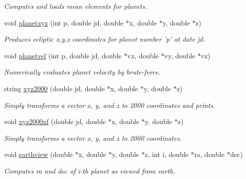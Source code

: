 \begin{DoxyCompactItemize}
\begin{DoxyCompactList}\small\item\em Computes and loads mean elements for planets. \end{DoxyCompactList}\item 
void \hyperlink{class_planets_affe556f802a6f7788a4956f79a17c38e}{planetxyz} (int p, double jd, double $\ast$x, double $\ast$y, double $\ast$z)
\begin{DoxyCompactList}\small\item\em Produces ecliptic x,y,z coordinates for planet number 'p' at date jd. \end{DoxyCompactList}\item 
void \hyperlink{class_planets_acef63742b8b2a08ae1c661fb0dcc25ce}{planetvel} (int p, double jd, double $\ast$vx, double $\ast$vy, double $\ast$vz)
\begin{DoxyCompactList}\small\item\em Numerically evaluates planet velocity by brute-\/force. \end{DoxyCompactList}\item 
string \hyperlink{class_planets_a72d643faf2889a444075e30f1b15e1d0}{xyz2000} (double jd, double $\ast$x, double $\ast$y, double $\ast$z)
\begin{DoxyCompactList}\small\item\em Simply transforms a vector x, y, and z to 2000 coordinates and prints. \end{DoxyCompactList}\item 
void \hyperlink{class_planets_a7be7ec28b633078e65adbab649435f4b}{xyz2000xf} (double jd, double $\ast$x, double $\ast$y, double $\ast$z)
\begin{DoxyCompactList}\small\item\em Simply transforms a vector x, y, and z to 2000 coordinates. \end{DoxyCompactList}\item 
void \hyperlink{class_planets_a25151a9bf62f71ce140a5c64bc3647c6}{earthview} (double $\ast$x, double $\ast$y, double $\ast$z, int i, double $\ast$ra, double $\ast$dec)
\begin{DoxyCompactList}\small\item\em Computes ra and dec of i-\/th planet as viewed from earth. \end{DoxyCompactList}\end{DoxyCompactItemize}
